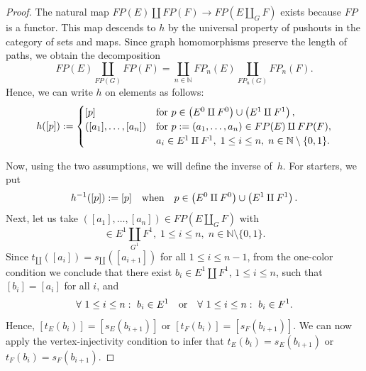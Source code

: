 \documentclass[12pt,times,a4paper]{amsart}
\numberwithin{equation}{section}
\def\text{\hbox}
\numberwithin{equation}{section}
\begin{document}
\begin{proof}
The natural map $FP(E)\amalg FP(F)\rightarrow FP(E\amalg_GF)$ exists because $FP$ is a functor. 
This map descends to $h$ by the universal
property of pushouts in the category of sets and maps. Since graph homomorphisms preserve the length
of paths, we obtain the decomposition
\begin{equation}
FP(E)\underset{FP(G)}{\amalg}FP(F)=\coprod_{n\in\mathbb{N}} FP_n(E)\underset{FP_n(G)}{\amalg}FP_n(F).
\end{equation}
Hence,  we can write $h$ on elements as follows:
\begin{equation}
h([p]):=\begin{cases}
[p] &\text{for } p\in \left(E^0\amalg F^0\right)\cup \left(E^1\amalg F^1\right),\\
([a_1],\ldots,[a_n]) &\text{for } p:=(a_1,\ldots,a_n)\in FP(E)\amalg FP(F),\\
&a_i\in E^1\amalg F^1,\;1\leq i\leq n,\;n\in\mathbb{N}\setminus\{0,1\}.
\end{cases}
\end{equation}

Now, using the two assumptions, we will define the inverse of~$h$. For starters, we put 
\begin{equation}\label{zeroone}
h^{-1}([p]):=[p]\quad
\text{when}\quad p\in \left(E^0\amalg F^0\right)\cup \left(E^1\amalg F^1\right).
\end{equation}
Next, let us take $([a_1],\ldots,[a_n])\in FP(E\amalg_GF)$
 with 
\begin{equation}
[a_i]\in E^1\underset{G^1}{\amalg}F^1,\; 1\leq i\leq n,\;
 n\in\mathbb{N}\setminus\{0,1\}. 
\end{equation}
Since $t_\amalg([a_i])=s_\amalg([a_{i+1}])$ for all $1\leq i\leq n-1$,
from the one-color condition we conclude that there exist $b_i\in E^1\amalg F^1$, $1\leq i\leq n$, such that $[b_i]=[a_i]$ for all $i$, and
\begin{equation}
\forall~1\leq i\leq n:~b_i\in E^1\quad\text{or}\quad\forall~1\leq i\leq n:~b_i\in F^1.
\end{equation}
Hence, $[t_E(b_i)]=[s_E(b_{i+1})]$ or $[t_F(b_i)]=[s_F(b_{i+1})]$. We can now apply the vertex-injectivity condition to infer that
$t_E(b_i)=s_E(b_{i+1})$ or $t_F(b_i)=s_F(b_{i+1})$. 


\end{proof}
\end{document}
